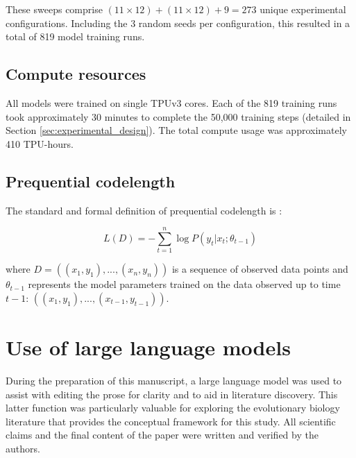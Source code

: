 These sweeps comprise $(11\times12) + (11\times12) + 9 = 273$ unique experimental configurations. Including the 3 random seeds per configuration, this resulted in a total of 819 model training runs.

\subsection{Compute resources}
\label{sec:compute}

All models were trained on single TPUv3 cores. Each of the 819 training runs took approximately 30 minutes to complete the 50,000 training steps (detailed in Section \ref{sec:experimental_design}). The total compute usage was approximately 410 TPU-hours.

\subsection{Prequential codelength}
\label{sec:prequential}

The standard and formal definition of prequential codelength is \cite{blier2018description}:

$$L(D) = -\sum_{t=1}^n \log P(y_t|x_t; \theta_{t-1})$$

where $D = ((x_1, y_1), ..., (x_n, y_n))$ is a sequence of observed data points and $\theta_{t-1}$ represents the model parameters trained on the data observed up to time $t-1$: $((x_1, y_1), ..., (x_{t-1}, y_{t-1}))$. 

\section{Use of large language models}

During the preparation of this manuscript, a large language model was used to assist with editing the prose for clarity and to aid in literature discovery. This latter function was particularly valuable for exploring the evolutionary biology literature that provides the conceptual framework for this study. All scientific claims and the final content of the paper were written and verified by the authors.